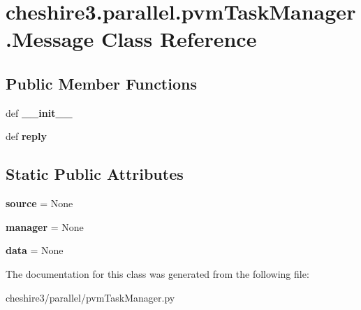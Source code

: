 \hypertarget{classcheshire3_1_1parallel_1_1pvm_task_manager_1_1_message}{\section{cheshire3.\-parallel.\-pvm\-Task\-Manager.\-Message Class Reference}
\label{classcheshire3_1_1parallel_1_1pvm_task_manager_1_1_message}
}
\subsection*{Public Member Functions}
\begin{DoxyCompactItemize}
\item 
\hypertarget{classcheshire3_1_1parallel_1_1pvm_task_manager_1_1_message_a9a19d0e35aea419c35b50431ab1662dc}{def {\bfseries \-\_\-\-\_\-init\-\_\-\-\_\-}}\label{classcheshire3_1_1parallel_1_1pvm_task_manager_1_1_message_a9a19d0e35aea419c35b50431ab1662dc}

\item 
\hypertarget{classcheshire3_1_1parallel_1_1pvm_task_manager_1_1_message_a599bb91ec90b34a18a3ed3fa1cb023b5}{def {\bfseries reply}}\label{classcheshire3_1_1parallel_1_1pvm_task_manager_1_1_message_a599bb91ec90b34a18a3ed3fa1cb023b5}

\end{DoxyCompactItemize}
\subsection*{Static Public Attributes}
\begin{DoxyCompactItemize}
\item 
\hypertarget{classcheshire3_1_1parallel_1_1pvm_task_manager_1_1_message_a9f186a53a43c6c19f345a79672ee80ac}{{\bfseries source} = None}\label{classcheshire3_1_1parallel_1_1pvm_task_manager_1_1_message_a9f186a53a43c6c19f345a79672ee80ac}

\item 
\hypertarget{classcheshire3_1_1parallel_1_1pvm_task_manager_1_1_message_a9aabebdaf67cb4d814ccf8e2fee19f0a}{{\bfseries manager} = None}\label{classcheshire3_1_1parallel_1_1pvm_task_manager_1_1_message_a9aabebdaf67cb4d814ccf8e2fee19f0a}

\item 
\hypertarget{classcheshire3_1_1parallel_1_1pvm_task_manager_1_1_message_ab36fc3caed359cc8ee7bc7545a5bd9f6}{{\bfseries data} = None}\label{classcheshire3_1_1parallel_1_1pvm_task_manager_1_1_message_ab36fc3caed359cc8ee7bc7545a5bd9f6}

\end{DoxyCompactItemize}


The documentation for this class was generated from the following file\-:\begin{DoxyCompactItemize}
\item 
cheshire3/parallel/pvm\-Task\-Manager.\-py\end{DoxyCompactItemize}
